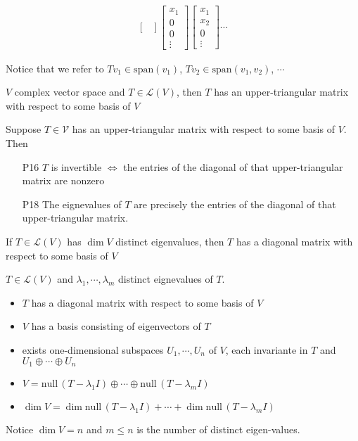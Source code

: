 \documentclass[11pt,notitlepage,oneside]{article}
\DeclareMathOperator{\dimension}{dim}
\newcommand{\nullspace}[1]{\mathrm{null}\,{#1}}
\begin{document}
\begin{description}
\begin{itemize}
\begin{align*}
\begin{bmatrix}
\end{bmatrix}
\begin{bmatrix}
x_1\\
0 \\
0 \\
\vdots
\end{bmatrix}
\begin{bmatrix}
x_1\\
x_2 \\
0 \\
\vdots
\end{bmatrix}
\cdots
\end{align*}
\end{itemize}
Notice that we refer to $Tv_1 \in \mathrm{span}(v_1)$, $Tv_2 \in \mathrm{span}(v_1, v_2)$, $\cdots$

\item[T13] $V$ complex vector space and $T\in\mathcal{L}(V)$, then $T$ has an upper-triangular matrix with respect to some basis of $V$

\item Suppose $T\in\mathcal{V}$ has an upper-triangular matrix with respect to some basis of $V$. Then
\begin{itemize}
 \item[P16] $T$ is invertible $\iff$ the entries of the diagonal of that upper-triangular matrix are nonzero
 \item[P18] The eignevalues of $T$ are precisely the entries of the diagonal of that upper-triangular matrix.
\end{itemize}

\item[P20] If $T\in\mathcal{L}(V)$ has $\dimension{V}$ distinct eigenvalues, then $T$ has a diagonal matrix with respect to some basis of $V$

\item[P21\label{itm:P5_21}] $T\in\mathcal{L}(V)$ and $\lambda_1,\cdots,\lambda_m$ distinct eignevalues of $T$.
\begin{itemize}
\item $T$ has a diagonal matrix with respect to some basis of $V$
\item $V$ has a basis consisting of eigenvectors of $T$
\item exists one-dimensional subspaces $U_1,\cdots,U_n$ of $V$, each invariante in $T$ and $U_1\oplus\cdots\oplus U_n$
\item $V=\nullspace{(T-\lambda_1I)}\oplus\cdots \oplus\nullspace{(T-\lambda_mI)}$
\item $\dimension{V}=\dimension{\nullspace{(T-\lambda_1I)}}+\cdots+ \dimension{\nullspace{(T-\lambda_mI)}}$
\end{itemize}
Notice $\dimension{V}=n$ and $m\leq n$ is the number of distinct eigen-values.


\end{description}
\end{document}
